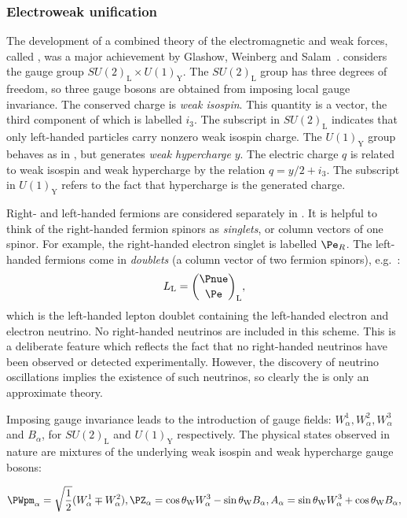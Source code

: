 \subsubsection{Electroweak unification}

The development of a combined theory of the electromagnetic and weak forces, called \EWT, was a major achievement by Glashow, Weinberg and Salam~\cite{GlashowPartialSymmetries,WeinbergModelOfLeptons,SalamNobelSymposium}. %
\EWT considers the gauge group $SU(2)_{\textrm{L}} \times U(1)_{\textrm{Y}}$. The $SU(2)_{\textrm{L}}$ group has three degrees of freedom, so three gauge bosons are obtained from imposing local gauge invariance. The conserved charge is \emph{weak isospin}. This quantity is a vector, the third component of which is labelled $i_3$. The subscript in $SU(2)_{\textrm{L}}$ indicates that only left-handed particles carry nonzero weak isospin charge. The $U(1)_{\textrm{Y}}$ group behaves as in \QED, but generates \emph{weak hypercharge} $y$. The electric charge $q$ is related to weak isospin and weak hypercharge by the relation $q=y/2 + i_3$. The subscript in $U(1)_{\textrm{Y}}$ refers to the fact that hypercharge is the generated charge.

Right- and left-handed fermions are considered separately in \EWT. It is helpful to think of the right-handed fermion spinors as \emph{singlets}, or column vectors of one spinor. For example, the right-handed electron singlet is labelled $\Pe_{R}$. 
The left-handed fermions come in \emph{doublets} (a column vector of two fermion spinors), e.g.~:
$$
L_{\textrm{L}}=\binom{\Pnue}{\Pe}_{\textrm{L}},
$$
which is the left-handed lepton doublet containing the left-handed electron and electron neutrino. No right-handed neutrinos are included in this scheme. This is a deliberate feature which reflects the fact that no right-handed neutrinos have been observed or detected experimentally. However, the discovery of neutrino oscillations implies the existence of such neutrinos, so clearly the \SM is only an approximate theory. 

Imposing gauge invariance leads to the introduction of gauge fields: $W_{\alpha}^{1},W_{\alpha}^{2},W_{\alpha}^{3}$ and $B_{\alpha}$, for $SU(2)_{\textrm{L}}$ and $U(1)_{\textrm{Y}}$ respectively. The physical states observed in nature are mixtures of the underlying weak isospin and weak hypercharge gauge bosons:

\begin{equation}
\label{eq:th:electroweak_gauge_bosons}
\PWpm_{\alpha} = \sqrt{\frac{1}{2}}(W_{\alpha}^{1} \mp W_{\alpha}^{2}) ,\\
\PZ_{\alpha} = \cos \theta_{\textrm{W}} W_{\alpha}^{3} - \sin \theta_{\textrm{W}} B_{\alpha} ,\\
A_{\alpha} = \sin \theta_{\textrm{W}} W_{\alpha}^{3} + \cos \theta_{\textrm{W}} B_{\alpha} ,
\end{equation}

